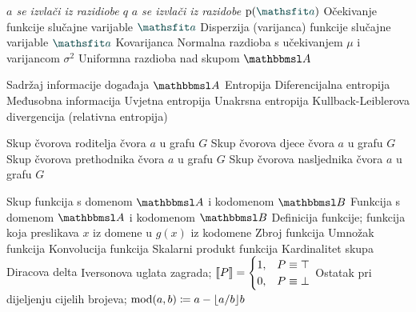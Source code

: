  {\textit{$a$ se izvlači iz razidiobe $q$}}
 {\textit{$a$ se izvlači iz razidobe $\p(\rvar a)$}}
 {Očekivanje funkcije slučajne varijable $\rvar a$}
 {Disperzija (varijanca) funkcije slučajne varijable $\rvar a$}
		{Kovarijanca}
 {Normalna razdioba s učekivanjem $\mu$ i varijancom $\sigma^2$}
	{Uniformna razdioba nad skupom $\set A$}

	{Sadržaj informacije događaja $\set A$}
	{Entropija}
	{Diferencijalna entropija}
	{Međusobna informacija}
	{Uvjetna entropija}
	{Unakrsna entropija}
	{Kullback-Leiblerova divergencija (relativna entropija)}

	{Skup čvorova roditelja čvora $a$ u grafu $G$}
	{Skup čvorova djece čvora $a$ u grafu $G$}
	{Skup čvorova prethodnika čvora $a$ u grafu $G$}
	{Skup čvorova nasljednika čvora $a$ u grafu $G$}

	{Skup funkcija s domenom $\set A$ i kodomenom $\set B$}
	{Funkcija s domenom $\set A$ i kodomenom $\set B$}
	{Definicija funkcije; funkcija koja preslikava $x$ iz domene u $g(x)$ iz kodomene}
	{Zbroj funkcija}
	{Umnožak funkcija}
	{Konvolucija funkcija}
	{Skalarni produkt funkcija}
	{Kardinalitet skupa}
	{Diracova delta}
	{Iversonova uglata zagrada; $\enbbracket{P}=\begin{cases} 1, & P \equiv \top \\ 0, & P \equiv \bot \end{cases}$}
	{Ostatak pri dijeljenju cijelih brojeva; $\operatorname{mod}(a,b)\coloneqq a-\lfloor a/b\rfloor b$}

